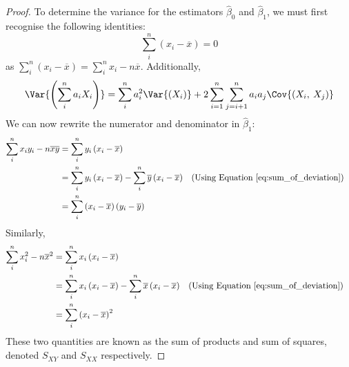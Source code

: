 \documentclass{article}
\begin{document}
\begin{proof}
    To determine the variance for the estimators $\hat{\beta}_0$ and $\hat{\beta}_1$, we must first recognise the following identities:
    \begin{equation}
        \sum_i^n \left( x_i - \overline{x} \right) = 0 \label{eq:sum_of_deviation}
    \end{equation}
    as $\sum_i^n \left( x_i - \overline{x} \right) = \sum_i^n x_i - n \overline{x}$.
    Additionally,
    \begin{equation}
        \Var{\left(\sum_{i}^n a_iX_i\right)} = \sum_i^na_i^2 \Var{\left(X_i\right)} + 2\sum_{i=1}^n\sum_{j=i+1}^na_ia_j\Cov{\left(X_i,\:X_j\right)} \label{eq:variance_of_weighted_sums}
    \end{equation}
    We can now rewrite the numerator and denominator in $\hat{\beta}_1$:
    \begin{align*}
        \sum_i^n x_i y_i - n \overline{x} \overline{y} & = \sum_i^n y_i \left( x_i - \overline{x} \right)                                                                                                                  \\
                                                       & = \sum_i^n y_i \left( x_i - \overline{x} \right) - \sum_i^n \overline{y} \left( x_i - \overline{x} \right) &  & \text{(Using Equation \ref{eq:sum_of_deviation})} \\
                                                       & = \sum_i^n \left( x_i - \overline{x} \right) \left( y_i - \overline{y} \right)
    \end{align*}
    Similarly,
    \begin{align*}
        \sum_i^n x_i^2- n \overline{x}^2 & = \sum_i^n x_i \left( x_i - \overline{x} \right)                                                                                                                  \\
                                         & = \sum_i^n x_i \left( x_i - \overline{x} \right) - \sum_i^n \overline{x} \left( x_i - \overline{x} \right) &  & \text{(Using Equation \ref{eq:sum_of_deviation})} \\
                                         & = \sum_i^n \left( x_i - \overline{x} \right)^2
    \end{align*}
    These two quantities are known as the sum of products and sum of squares, denoted $S_{XY}$ and $S_{XX}$ respectively.


\end{proof}
\end{document}
